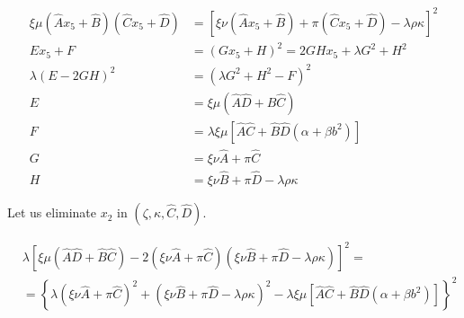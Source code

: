 \documentclass[12pt]{article}
\numberwithin{table}{section}
\begin{document}
\begin{align}
\xi \mu (\hat A x_5 + \hat B)(\hat C x_5 + \hat D)  &= \left[ \xi\nu (\hat A x_5 + \hat B)  + \pi (\hat C x_5 + \hat D) - \lambda \rho \kappa \right]^2 \\
E x_5 + F  &= ( G x_5 + H )^2 = 2GH x_5 + \lambda G^2 + H^2 \\
\lambda (E - 2GH)^2  &= \left(\lambda G^2 + H^2 - F\right)^2 \\
E &= \xi \mu(\hat A\hat D + \hat B\hat C)\\
F &= \lambda \xi \mu [\hat A\hat C + \hat B\hat D(\alpha + \beta b^2)] \\
G &= \xi \nu \hat A + \pi \hat C \\
H &= \xi \nu \hat B + \pi \hat D - \lambda \rho \kappa
\end{align}

Let us eliminate $x_2$ in $(\zeta,\kappa, \hat C, \hat D)$.

\footnotesize

\begin{align}
&\lambda \left[\xi \mu(\hat A\hat D + \hat B\hat C) - 2\left(\xi \nu \hat A + \pi \hat C\right) \left(\xi \nu \hat B + \pi \hat D - \lambda \rho \kappa\right) \right]^2 = \nonumber\\
&= \left\{\lambda \left(\xi \nu \hat A + \pi \hat C\right)^2 + \left(\xi \nu \hat B   + \pi \hat D - \lambda \rho \kappa\right) ^2 - \lambda \xi \mu [\hat A\hat C + \hat B\hat D(\alpha + \beta b^2)]\right\}^2 
\end{align}

\normalsize
\end{document}
